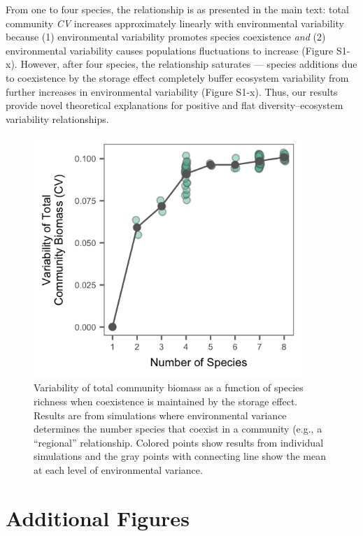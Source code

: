\documentclass[11pt,]{article}
\begin{document}
From one to four species, the relationship is as presented in the main
text: total community \emph{CV} increases approximately linearly with
environmental variability because (1) environmental variability promotes
species coexistence \emph{and} (2) environmental variability causes
populations fluctuations to increase (Figure S1-x). However, after four
species, the relationship saturates --- species additions due to
coexistence by the storage effect completely buffer ecosystem
variability from further increases in environmental variability (Figure
S1-x). Thus, our results provide novel theoretical explanations for
positive and flat diversity--ecosystem variability relationships.

\begin{figure}[!ht]
  \centering
      \includegraphics[width=4in]{./components/regional_diversity_stability_storage_effect_8species.png}
  \caption{Variability of total community biomass as a function of species richness when coexistence is maintained by the storage effect. Results are from simulations where environmental variance determines the number species that coexist in a community (e.g., a ``regional'' relationship. Colored points show results from individual simulations and the gray points with connecting line show the mean at each level of environmental variance.}
\end{figure}

\newpage{}

\section{Additional Figures}
\end{document}
